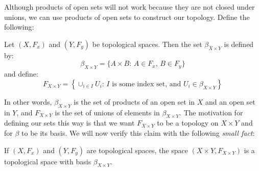 Although products of open sets will not work because they are not closed under unions, we can use products of open sets to construct our topology. Define the following: 
\begin{definition}
	Let $(X,F_x)$ and $(Y,F_y)$ be topological spaces. Then the set $\beta_{X\times Y}$ is defined by:
	\[\beta_{X\times Y} = \{A\times B:\,A\in F_x,\,B\in F_y\}\]
	and define:
	\[F_{X\times Y} = \left\{\cup_{i\in I} U_i:\,I \text{ is some index set, and }U_i\in \beta_{X\times Y}\right\}\]
\end{definition}
In other words, $\beta_{X\times Y}$ is the set of products of an open set in $X$ and an open set in $Y$, and $F_{X\times Y}$ is the set of unions of elements in $\beta_{X\times Y}$. The motivation for defining our sets this way is that we want $F_{X\times Y}$ to be a topology on $X\times Y$ and for $\beta$ to be its basis. We will now verify this claim with the following \emph{small fact}: 
\begin{theorem}
	If $(X,F_x)$ and $(Y,F_y)$ are topological spaces, the space $(X\times Y,F_{X\times Y})$ is a topological space with basis $\beta_{X\times Y}$. 
\end{theorem}
